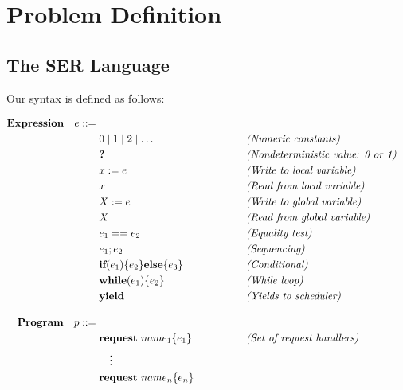 
\section{Problem Definition}
\label{sec:problem-definition}

\subsection{The SER Language}
Our \toolname{} syntax is defined as follows: 

\[
\begin{aligned}
	\mathbf{Expression}\quad e ::={}&{} \\
	&0 \mid 1 \mid 2 \mid \dots 
	&&\qquad\qquad\emph{(Numeric constants)}\\
	&\textbf{?}
	&&\qquad\qquad\emph{(Nondeterministic value: 0 or 1)}\\
	&x := e
	&&\qquad\qquad\emph{(Write to local variable)}\\
	&x
	&&\qquad\qquad\emph{(Read from local variable)}\\
	&X := e
	&&\qquad\qquad\emph{(Write to global variable)}\\
	&X
	&&\qquad\qquad\emph{(Read from global variable)}\\
	&e_1 == e_2
	&&\qquad\qquad\emph{(Equality test)}\\
	&e_1 ; e_2
	&&\qquad\qquad\emph{(Sequencing)}\\
	&\textbf{if}(e_1)\{e_2\}\textbf{else}\{e_3\}
	&&\qquad\qquad\emph{(Conditional)}\\
	&\textbf{while}(e_1)\{e_2\}
	&&\qquad\qquad\emph{(While loop)}\\
	&\textbf{yield}
	&&\qquad\qquad\emph{(Yields to scheduler)}\\[1em]
	\mathbf{Program}\quad p ::={}&{} \\
	&\textbf{request}\ name_1\{e_1\}
	&&\qquad\qquad\emph{(Set of request handlers)}\\
	&\quad\vdots\\
	&\textbf{request}\ name_n\{e_n\}
\end{aligned}
\]

